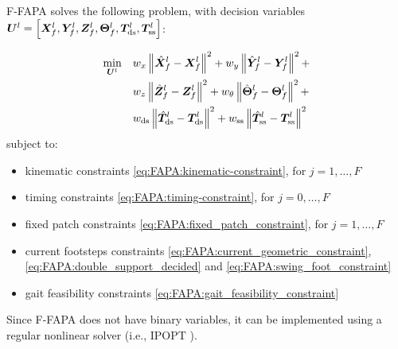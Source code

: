 \begin{sloppypar}
F-FAPA solves the following problem, with decision variables
${{\bm{U}}^l = \left[\bm{X}_f^l, \bm{Y}_f^l, \bm{Z}_f^l, \bm{\Theta}_f^l, \bm{T}_{\rm ds}^l, \bm{T}_{\rm ss}^l\right]}$:
\end{sloppypar}
\begin{braced}
    \begin{equation*}
        \begin{split}
            \min_{{\bm{U}}^l}\quad
            & w_x \left\| \hat{\bm{X}}_f^l - \bm{X}_f^l \right\|^2 + w_y \left\| \hat{\bm{Y}}_f^l - \bm{Y}_f^l \right\|^2 + \\& w_z \left\| \hat{\bm{Z}}_f^l - \bm{Z}_f^l \right\|^2 + w_{\theta} \left\| \hat{\bm{\Theta}}_f^l - \bm{\Theta}_f^l \right\|^2 + \\& w_{\rm ds} \left\| \hat{\bm{T}}_{\rm ds}^l - \bm{T}_{\rm ds}^l \right\|^2 + w_{\rm ss} \left\| \hat{\bm{T}}_{\rm ss}^l - \bm{T}_{\rm ss}^l \right\|^2
        \end{split}
    \end{equation*}
    \hspace{0.25cm} subject to:
    \begin{itemize}
        \item kinematic constraints \eqref{eq:FAPA:kinematic-constraint}, for $j=1,\dots,F$
        \item timing constraints \eqref{eq:FAPA:timing-constraint}, for $j=0,\dots,F$
        \item fixed patch constraints \eqref{eq:FAPA:fixed_patch_constraint}, for $j=1,\dots,F$
        \item current footsteps constraints \eqref{eq:FAPA:current_geometric_constraint}, \eqref{eq:FAPA:double_support_decided} and \eqref{eq:FAPA:swing_foot_constraint}
        \item gait feasibility constraints \eqref{eq:FAPA:gait_feasibility_constraint}
    \end{itemize}
\end{braced}

\medskip

Since F-FAPA does not have binary variables, it can be implemented using a
regular nonlinear solver (i.e., IPOPT \cite{Wachter2006IPOPT}).

